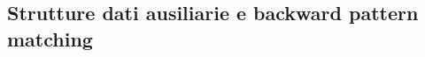 \documentclass{beamer}
\begin{document}
%
%	

\subsection{Strutture dati ausiliarie e backward pattern matching}
\end{document}
